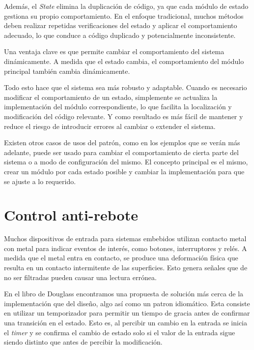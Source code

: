 Además, el \textit{State} elimina la duplicación de código, ya que cada módulo de estado gestiona su propio comportamiento. En el enfoque tradicional, muchos métodos deben realizar repetidas verificaciones del estado y aplicar el comportamiento adecuado, lo que conduce a código duplicado y potencialmente inconsistente.

Una ventaja clave es que permite cambiar el comportamiento del sistema dinámicamente. A medida que el estado cambia, el comportamiento del módulo principal también cambia dinámicamente. 

Todo esto hace que el sistema sea más robusto y adaptable. Cuando es necesario modificar el comportamiento de un estado, simplemente se actualiza la implementación del módulo correspondiente, lo que facilita la localización y modificación del código relevante. Y como resultado es más fácil de mantener y reduce el riesgo de introducir errores al cambiar o extender el sistema.

Existen otros casos de usos del patrón, como en los ejemplos que se verán más adelante, puede ser usado para cambiar el comportamiento de cierta parte del sistema o a modo de configuración del mismo. El concepto principal es el mismo, crear un módulo por cada estado posible y cambiar la implementación para que se ajuste a lo requerido.

\section{Control anti-rebote}
Muchos dispositivos de entrada para sistemas embebidos utilizan contacto metal con metal para indicar eventos de interés, como botones, interruptores y relés. A medida que el metal entra en contacto, se produce una deformación física que resulta en un contacto intermitente de las superficies. Esto genera señales que de no ser filtradas pueden causar una lectura errónea. 

En el libro de Douglass \cite{douglass} encontramos una propuesta de solución más cerca de la implementación que del diseño, algo así como un patron idiomático. Esta consiste en utilizar un temporizador para permitir un tiempo de gracia antes de confirmar una transición en el estado. Esto es, al percibir un cambio en la entrada se inicia el \textit{timer} y se confirma el cambio de estado solo si el valor de la entrada sigue siendo distinto que antes de percibir la modificación. 

